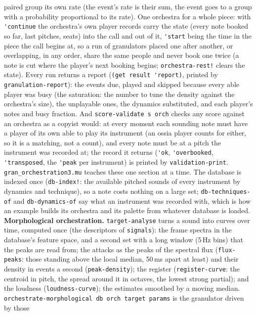 \documentclass[11pt,a4paper]{article}
\newcommand{\musil}[1]{\lstinline[style=musilinline]{#1}}
\begin{document}
paired group its own rate (the event's rate is their sum, the event goes to a group with a
probability proportional to its rate). One orchestra for a whole piece: with
\musil{'continue} the orchestra's own player records carry the state (every note booked so
far, last pitches, seats) into the call and out of it, \musil{'start} being the time in the
piece the call begins at, so a run of granulators placed one after another, or overlapping,
in any order, share the same people and never book one twice (a note is cut where the
player's next booking begins; \musil{orchestra-rest!} clears the state). Every run returns a
report (\musil{(get result 'report)}, printed by \musil{granulation-report}): the events due,
played and skipped because every able player was busy (the saturation: the number to tune
the density against the orchestra's size), the unplayable ones, the dynamics substituted, and
each player's notes and busy fraction. And \musil{score-validate s orch} checks any score
against an orchestra as a copyist would: at every moment each sounding note must have a
player of its own able to play its instrument (an ossia player counts for either, so it is
a matching, not a count), and every note must be at a pitch the instrument was recorded at;
the record it returns (\musil{'ok}, \musil{'overbooked}, \musil{'transposed}, the
\musil{'peak} per instrument) is printed by \musil{validation-print}.
\texttt{gran\_orchestration3.mu} teaches these one section at a time. The database is indexed once
(\musil{db-index!}: the available pitched sounds of every instrument by dynamics and
technique), so a note costs nothing on a large set; \musil{db-techniques-of} and
\musil{db-dynamics-of} say what an instrument was recorded with, which is how an example
builds its orchestra and its palette from whatever database is loaded.
\textbf{Morphological orchestration.} \musil{target-analyse} turns a sound into curves
over time, computed once (the descriptors of \texttt{signals}): the frame spectra in the
database's feature space, and a second set with a long window (5\,Hz bins) that the peaks
are read from; the attacks as the peaks of the spectral flux (\musil{flux-peaks}: those
standing above the local median, 50\,ms apart at least) and their density in events a
second (\musil{peak-density}); the register (\musil{register-curve}: the centroid in pitch,
the spread around it in octaves, the lowest strong partial); and the loudness
(\musil{loudness-curve}); the estimates smoothed by a moving median.
\musil{orchestrate-morphological db orch target params} is the granulator driven by those
\end{document}
